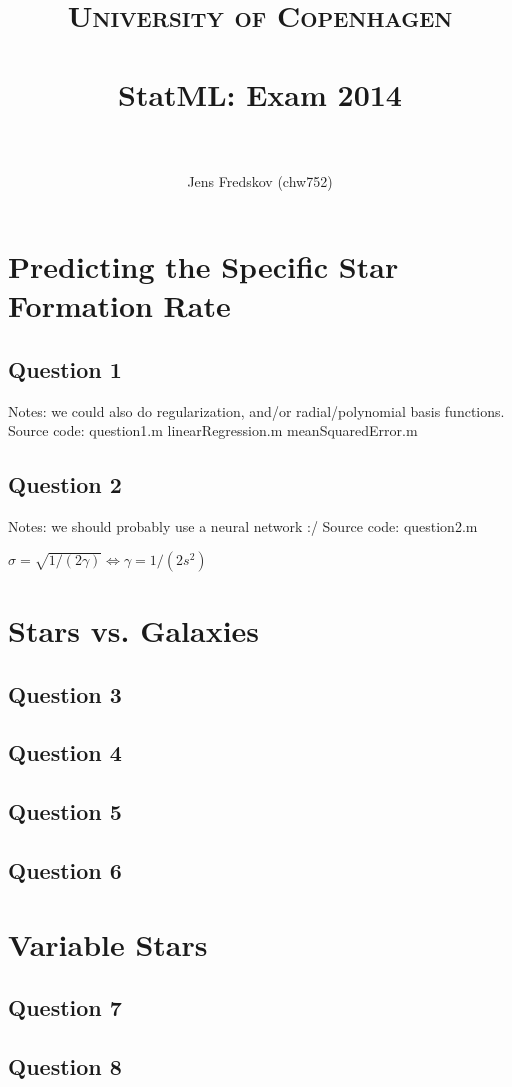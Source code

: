 \documentclass[a4paper, 11pt]{article}
\title{ 
\normalfont \normalsize 
\textsc{University of Copenhagen} \\ [25pt]
\horrule{0.5pt} \\[0.4cm]
\huge StatML: Exam 2014\\
\horrule{2pt} \\[0.5cm]
}
\author{Jens Fredskov (chw752)}
\begin{document}
\maketitle

\section{Predicting the Specific Star Formation Rate} %
\label{sec:predicting_the_specific_star_formation_rate}

\subsection*{Question 1}
Notes: we could also do regularization, and/or radial/polynomial basis functions.
Source code: question1.m linearRegression.m meanSquaredError.m

\subsection*{Question 2}
Notes: we should probably use a neural network :/
Source code: question2.m

$\sigma = \sqrt{1 / (2 \gamma)} \Leftrightarrow \gamma = 1 / (2s^2)$


\section{Stars vs. Galaxies} %
\label{sec:stars_vs_galaxies}

\subsection*{Question 3}

\subsection*{Question 4}

\subsection*{Question 5}

\subsection*{Question 6}


\section{Variable Stars} %
\label{sec:variable_stars}

\subsection*{Question 7}

\subsection*{Question 8}

\end{document}
